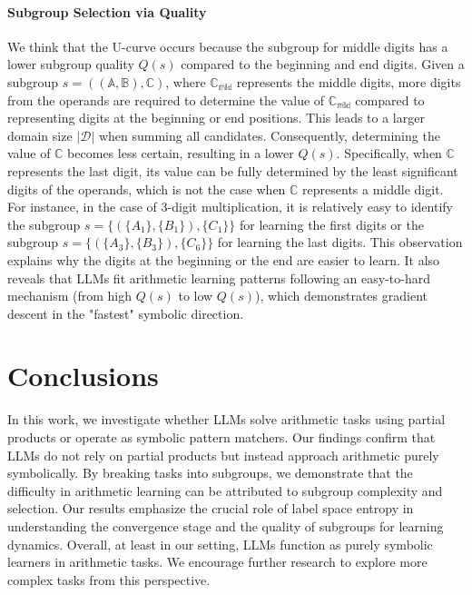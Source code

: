 \documentclass[11pt]{article}
\begin{document}
\paragraph{Subgroup Selection via Quality}
We think that the U-curve occurs because the subgroup for middle digits has a lower subgroup quality \( Q(s) \) compared to the beginning and end digits. Given a subgroup \( s = ((\mathbb{A}, \mathbb{B}), \mathbb{C}) \), where \( \mathbb{C_{\text{mid}}} \) represents the middle digits, more digits from the operands are required to determine the value of \( \mathbb{C_{\text{mid}}} \) compared to representing digits at the beginning or end positions. This leads to a larger domain size \( |\mathcal{D}| \) when summing all candidates. Consequently, determining the value of \( \mathbb{C} \) becomes less certain, resulting in a lower \( Q(s) \). Specifically, when \( \mathbb{C} \) represents the last digit, its value can be fully determined by the least significant digits of the operands, which is not the case when \( \mathbb{C} \) represents a middle digit. For instance, in the case of 3-digit multiplication, it is relatively easy to identify the subgroup \( s = \{(\{A_1\}, \{B_1\}), \{C_1\}\} \) for learning the first digits or the subgroup \( s = \{(\{A_3\}, \{B_3\}), \{C_6\}\} \) for learning the last digits. This observation explains why the digits at the beginning or the end are easier to learn. It also reveals that LLMs fit arithmetic learning patterns following an easy-to-hard mechanism (from high \( Q(s) \) to low \( Q(s) \)), which demonstrates gradient descent in the "fastest" symbolic direction.


\section{Conclusions}
In this work, we investigate whether LLMs solve arithmetic tasks using partial products or operate as symbolic pattern matchers. Our findings confirm that LLMs do not rely on partial products but instead approach arithmetic purely symbolically. By breaking tasks into subgroups, we demonstrate that the difficulty in arithmetic learning can be attributed to subgroup complexity and selection. Our results emphasize the crucial role of label space entropy in understanding the convergence stage and the quality of subgroups for learning dynamics. Overall, at least in our setting, LLMs function as purely symbolic learners in arithmetic tasks. We encourage further research to explore more complex tasks from this perspective.
\end{document}
